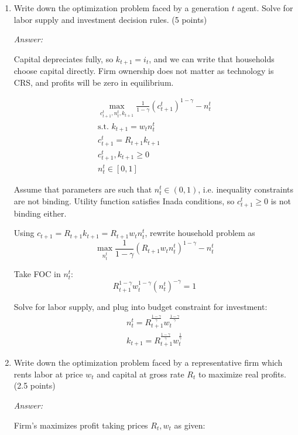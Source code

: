 \documentclass{article}
\begin{document}
\begin{enumerate}
\item Write down the optimization problem faced by a generation $t$ agent.
Solve for labor supply and investment decision rules. (5 points)

\textit{Answer:}

Capital depreciates fully, so $k_{t+1}=i_t$, and we can write that
households choose capital directly. Firm ownership does not matter as
technology is CRS, and profits will be zero in equilibrium.

  \begin{gather*}
    \max_{c_{t+1}^t,n_t^t,
      k_{t+1}}\frac{1}{1-\gamma}(c_{t+1}^{t})^{1-\gamma}-n_{t}^{t}\\
    \text{s.t. } k_{t+1}=w_tn_t^t\\
    c_{t+1}^t=R_{t+1}k_{t+1}\\
    c_{t+1}^t, k_{t+1}\ge 0\\
    n_{t}^t\in [0,1]
  \end{gather*}

Assume that parameters are such that $n_t^t\in(0,1)$, i.e. inequality
constraints are not binding. Utility function satisfies Inada
conditions, so $c_{t+1}^t\ge 0$ is not binding either.

Using $c_{t+1}=R_{t+1}k_{t+1}=R_{t+1}w_tn_t^t$, rewrite household
problem as
\begin{equation*}
  \max_{n_t^t}\frac{1}{1-\gamma}(R_{t+1}w_tn_t^t)^{1-\gamma}-n_{t}^{t}
\end{equation*}

Take FOC in $n_t^t$:
\begin{equation*}
  R_{t+1}^{1-\gamma}w_t^{1-\gamma}(n_t^t)^{-\gamma}=1
\end{equation*}

Solve for labor supply, and plug into budget constraint for investment:
\begin{gather*}
  n_t^t=R_{t+1}^\frac{1-\gamma}{\gamma}w_t^\frac{1-\gamma}{\gamma}\\
  k_{t+1}=R_{t+1}^\frac{1-\gamma}{\gamma}w_t^\frac{1}{\gamma}
\end{gather*}


\item Write down the optimization problem faced by a representative firm
which rents labor at price $w_{t}$ and capital at gross rate $R_{t}$ to
maximize real profits. (2.5 points)

\textit{Answer:}

Firm's maximizes profit taking prices $R_t,w_t$ as given:


\end{enumerate}
\end{document}
